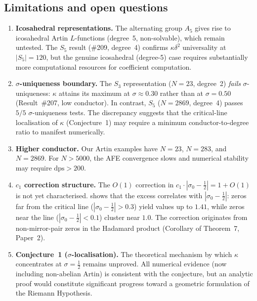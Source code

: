 \documentclass[11pt, a4paper]{article}
\theoremstyle{plain}
\theoremstyle{definition}
\newcommand{\abs}[1]{\left|#1\right|}
\newcommand{\kap}{\kappa}             %
\begin{document}
\subsection{Limitations and open questions}
\label{sec:limitations}

\begin{enumerate}
  \item \textbf{Icosahedral representations.}
    The alternating group $A_{5}$ gives rise to icosahedral Artin
    $L$-functions (degree~5, non-solvable), which remain untested.
    The $S_{5}$ result (\#209, degree~4) confirms $\kap\delta^{2}$
    universality at $|S_{5}|=120$, but the genuine icosahedral
    (degree-5) case requires substantially more computational
    resources for coefficient computation.
  \item \textbf{$\sigma$-uniqueness boundary.}
    The $S_{3}$ representation ($N=23$, degree~2) \emph{fails}
    $\sigma$-uniqueness: $\kap$ attains its maximum at $\sigma\approx0.30$
    rather than at $\sigma=0.50$ (Result~\#207, low conductor).
    In contrast, $S_{5}$ ($N=2869$, degree~4) passes $5/5$
    $\sigma$-uniqueness tests.  The discrepancy suggests that the
    critical-line localisation of $\kap$ (Conjecture~1) may require
    a minimum conductor-to-degree ratio to manifest numerically.
  \item \textbf{Higher conductor.}
    Our Artin examples have $N=23$, $N=283$, and $N=2869$.  For
    $N > 5000$, the AFE convergence slows and numerical stability may
    require $\text{dps} > 200$.
  \item \textbf{$c_{1}$ correction structure.}
    The $O(1)$ correction in $c_{1}\cdot\abs{\sigma_{0}-\tfrac{1}{2}} = 1 + O(1)$
    is not yet characterised.   shows
    that the excess correlates with $\abs{\sigma_{0}-\tfrac{1}{2}}$:
    zeros far from the critical line ($\abs{\sigma_{0}-\tfrac{1}{2}} > 0.3$)
    yield values up to $1.41$, while zeros near the line
    ($\abs{\sigma_{0}-\tfrac{1}{2}} < 0.1$) cluster near $1.0$.
    The correction originates from non-mirror-pair zeros in the
    Hadamard product (Corollary of Theorem~7, Paper~2).
  \item \textbf{Conjecture~1 ($\sigma$-localisation).}
    The theoretical mechanism by which $\kap$ concentrates at
    $\sigma = \tfrac{1}{2}$ remains unproved.  All numerical evidence
    (now including non-abelian Artin) is consistent with the
    conjecture, but an analytic proof would constitute significant
    progress toward a geometric formulation of the Riemann Hypothesis.
\end{enumerate}
\end{document}
